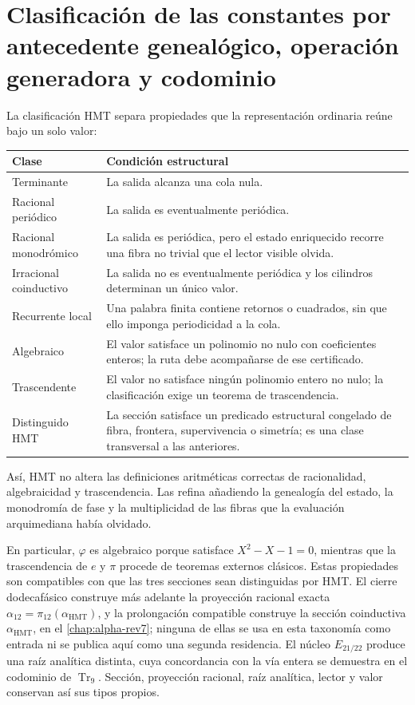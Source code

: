 \section{Clasificación de las constantes por antecedente genealógico, operación generadora y codominio}

La clasificación HMT separa propiedades que la representación ordinaria
reúne bajo un solo valor:
\begin{center}
\begin{tabular}{p{}p{}}
\toprule
Clase & Condición estructural \\
\midrule
Terminante & La salida alcanza una cola nula. \\
Racional periódico & La salida es eventualmente periódica. \\
Racional monodrómico & La salida es periódica, pero el estado enriquecido
recorre una fibra no trivial que el lector visible olvida. \\
Irracional coinductivo & La salida no es eventualmente periódica y los
cilindros determinan un único valor. \\
Recurrente local & Una palabra finita contiene retornos o cuadrados, sin que
ello imponga periodicidad a la cola. \\
Algebraico & El valor satisface un polinomio no nulo con coeficientes enteros;
la ruta debe acompañarse de ese certificado. \\
Trascendente & El valor no satisface ningún polinomio entero no nulo; la
clasificación exige un teorema de trascendencia. \\
Distinguido HMT & La sección satisface un predicado estructural congelado de
fibra, frontera, supervivencia o simetría; es una clase transversal a las
anteriores. \\
\bottomrule
\end{tabular}
\end{center}

Así, HMT no altera las definiciones aritméticas correctas de racionalidad,
algebraicidad y trascendencia. Las refina añadiendo la genealogía del estado,
la monodromía de fase y la multiplicidad de las fibras que la evaluación
arquimediana había olvidado.

En particular, \(\varphi\) es algebraico porque satisface
\(X^2-X-1=0\), mientras que la trascendencia de \(e\) y \(\pi\) procede de
teoremas externos clásicos. Estas propiedades son compatibles con que las tres
secciones sean distinguidas por HMT\@. El cierre dodecafásico construye más
adelante la proyección racional exacta
\(\alpha_{12}=\pi_{12}(\alpha_{\mathrm{HMT}})\), y la prolongación compatible
construye la sección coinductiva \(\alpha_{\mathrm{HMT}}\), en el
\cref{chap:alpha-rev7}; ninguna de ellas se usa en esta taxonomía como entrada
ni se publica aquí como una segunda residencia. El núcleo \(E_{21/22}\)
produce una raíz analítica distinta, cuya concordancia con la vía entera se
demuestra en el codominio de \(\operatorname{Tr}_9\). Sección, proyección
racional, raíz analítica, lector y valor conservan así sus tipos propios.

